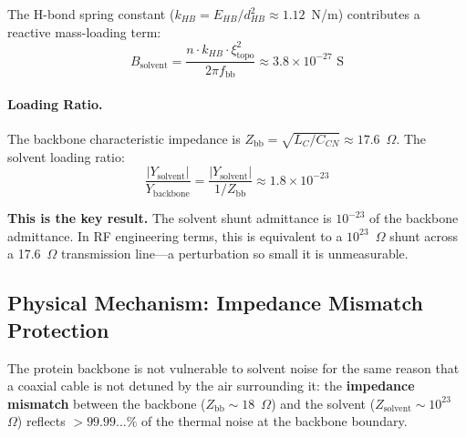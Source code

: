 The H-bond spring constant ($k_{HB} = E_{HB}/d_{HB}^2 \approx 1.12$~N/m) contributes a reactive mass-loading term:
\begin{equation}
    B_\text{solvent} = \frac{n \cdot k_{HB} \cdot \xi_\text{topo}^2}{2\pi f_\text{bb}} \approx 3.8 \times 10^{-27} \text{ S}
\end{equation}

\paragraph{Loading Ratio.}
The backbone characteristic impedance is $Z_\text{bb} = \sqrt{L_C / C_{CN}} \approx 17.6$~$\Omega$. The solvent loading ratio:
\begin{equation}
    \frac{|Y_\text{solvent}|}{Y_\text{backbone}} = \frac{|Y_\text{solvent}|}{1/Z_\text{bb}} \approx 1.8 \times 10^{-23}
\end{equation}

\textbf{This is the key result.} The solvent shunt admittance is $10^{-23}$ of the backbone admittance. In RF engineering terms, this is equivalent to a $10^{23}$~$\Omega$ shunt across a 17.6~$\Omega$ transmission line---a perturbation so small it is unmeasurable.

\subsection{Physical Mechanism: Impedance Mismatch Protection}

The protein backbone is not vulnerable to solvent noise for the same reason that a coaxial cable is not detuned by the air surrounding it: the \textbf{impedance mismatch} between the backbone ($Z_\text{bb} \sim 18$~$\Omega$) and the solvent ($Z_\text{solvent} \sim 10^{23}$~$\Omega$) reflects $> 99.99...\%$ of the thermal noise at the backbone boundary.

